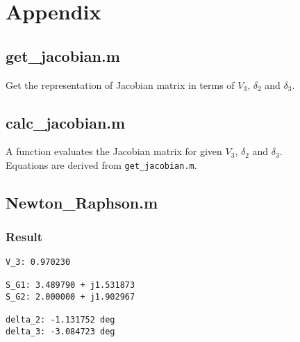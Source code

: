 \documentclass{article}
\begin{document}

\newpage
\section*{Appendix}

\subsection*{get\_jacobian.m}
Get the representation of Jacobian matrix in terms of $V_3$, $\delta_2$ and $\delta_3$.


\subsection*{calc\_jacobian.m}
A function evaluates the Jacobian matrix for given $V_3$, $\delta_2$ and $\delta_3$.\\
Equations are derived from \texttt{get\_jacobian.m}.


\newpage
\subsection*{Newton\_Raphson.m}


\subsubsection*{Result}
\begin{lstlisting}[language={}]
V_3: 0.970230

S_G1: 3.489790 + j1.531873
S_G2: 2.000000 + j1.902967

delta_2: -1.131752 deg
delta_3: -3.084723 deg
\end{lstlisting}

\end{document}
